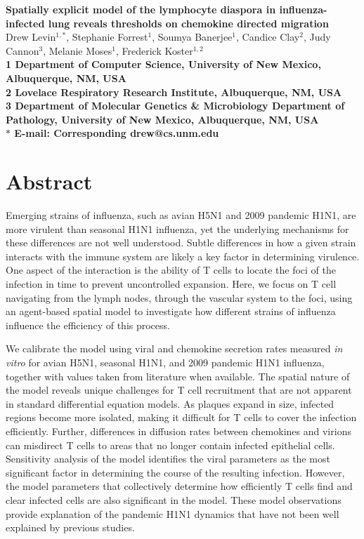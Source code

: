 \documentclass[10pt]{article}
\date{}
\begin{document}
\begin{flushleft}
{\Large
\textbf{Spatially explicit model of the lymphocyte diaspora in influenza-infected lung reveals thresholds on chemokine directed migration}
}
\\
Drew Levin$^{1,\ast}$, 
Stephanie Forrest$^{1}$, 
Soumya Banerjee$^{1}$,
Candice Clay$^{2}$, 
Judy Cannon$^{3}$,
Melanie Moses$^{1}$, 
Frederick Koster$^{1,2}$
\\
\bf{1} Department of Computer Science, University of New Mexico, Albuquerque, NM, USA
\\
\bf{2} Lovelace Respiratory Research Institute, Albuquerque, NM, USA
\\
\bf{3} Department of Molecular Genetics \& Microbiology Department of Pathology, University of New Mexico, Albuquerque, NM, USA
\\
$\ast$ E-mail: Corresponding drew@cs.unm.edu
\end{flushleft}



\section*{Abstract}

Emerging strains of influenza, such as avian H5N1 and 2009 pandemic H1N1, are more virulent than seasonal H1N1 influenza, yet the underlying mechanisms for these differences are not well understood.  Subtle differences in how a given strain interacts with the immune system are likely a key factor in determining virulence.  One aspect of the interaction is the ability of T cells to locate the foci of the infection in time to prevent uncontrolled expansion.  Here, we focus on T cell navigating from the lymph nodes, through the vascular system to the foci, using an agent-based spatial model to investigate how different strains of influenza influence the efficiency of this process.

We calibrate the model using viral and chemokine secretion rates measured \textit{in vitro} for avian H5N1, seasonal H1N1, and 2009 pandemic H1N1 influenza, together with values taken from literature when available.  The spatial nature of the model reveals unique challenges for T cell recruitment that are not apparent in standard differential equation models. As plaques expand in size, infected regions become more isolated, making it difficult for T cells to cover the infection efficiently.  Further, differences in diffusion rates between chemokines and virions can misdirect T cells to areas that no longer contain infected epithelial cells.  Sensitivity analysis of the model identifies the viral parameters as the most significant factor in determining the course of the resulting infection.  However, the model parameters that collectively determine how efficiently T cells find and clear infected cells are also significant in the model.  These model observations provide explanation of the pandemic H1N1 dynamics that have not been well explained by previous studies. 
\end{document}
